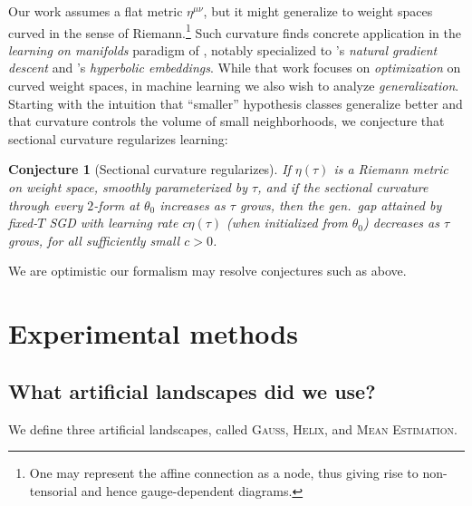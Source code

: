 \documentclass[anon,12pt]{colt2021} %
\newtheorem{conj}{Conjecture}
\newcommand{\Gauss}{\textsc{Gauss}}
\newcommand{\Helix}{\textsc{Helix}}
\newcommand{\MeanEstimation}{\textsc{Mean Estimation}}
\begin{document}
        Our work assumes a flat metric $\eta^{\mu\nu}$, but it might
        generalize to weight spaces curved in the sense of Riemann.\footnote{
            One may represent the affine connection as a node, thus giving
            rise to non-tensorial and hence gauge-dependent diagrams.
        }  Such curvature finds concrete application in the \emph{learning on
        manifolds} paradigm of \cite{ab07, zh16}, notably specialized to
        \cite{am98}'s \emph{natural gradient descent} and \cite{ni17}'s
        \emph{hyperbolic embeddings}.  While that work focuses on
        \emph{optimization} on curved weight spaces, in machine learning we
        also wish to analyze \emph{generalization}.
        Starting with the intuition that ``smaller'' hypothesis classes
        generalize better and that curvature controls the volume of small
        neighborhoods, we conjecture that sectional curvature regularizes
        learning:
        \begin{conj}[Sectional curvature regularizes]
            If $\eta(\tau)$ is a Riemann metric on weight space, smoothly
            parameterized by $\tau$, and if the sectional curvature through
            every $2$-form at $\theta_0$ increases as $\tau$ grows, then
            the gen.\ gap attained by fixed-$T$ SGD with learning rate $c
            \eta(\tau)$ (when initialized from $\theta_0$) decreases as $\tau$
            grows, for all sufficiently small $c>0$.
        \end{conj}
        We are optimistic our formalism may resolve conjectures such as above.


\newpage
\section{Experimental methods}\label{appendix:experiments}

    \subsection{What artificial landscapes did we use?}             \label{appendix:artificial}

        We define three artificial landscapes, called
        \Gauss, \Helix, and \MeanEstimation.
\end{document}
